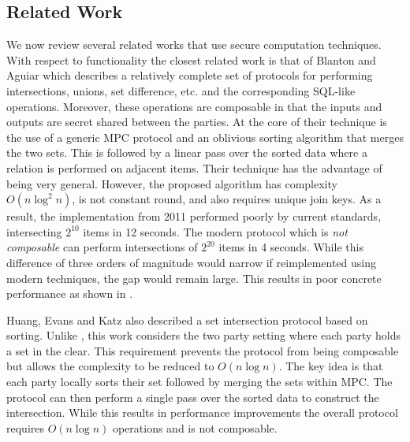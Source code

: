 \subsection{Related Work}
We now review several related works that use secure computation techniques. With respect to functionality the closest related work is that of Blanton and Aguiar\cite{ASIACCS:BlaAgu12} which describes a relatively complete set of protocols for performing intersections, unions, set difference, etc. and the corresponding SQL-like operations. Moreover, these operations are composable in that the inputs and outputs are secret shared between the parties. At the core of their technique is the use of a generic MPC protocol and an oblivious sorting algorithm that merges the two sets. This is followed by a linear pass over the sorted data where a relation is performed on adjacent items. Their technique has the advantage of being very general. However, the proposed algorithm has complexity $O(n \log^2 n)$, is not constant round,  and also requires unique join keys. 
\iffullversion
As a result, the implementation from 2011 performed poorly by current standards, intersecting $2^{10}$ items in 12 seconds. The modern protocol \cite{CCS:KKRT16} which is \emph{not composable} can perform intersections of $2^{20}$ items in 4 seconds. While this difference of three orders of magnitude would narrow if reimplemented using modern techniques, the gap would remain large.
\else
This results in poor concrete performance as shown in .
\fi


\iffullversion
Huang, Evans and Katz\cite{HEK12} also described a set intersection protocol based on sorting. Unlike \cite{ASIACCS:BlaAgu12}, this work considers the two party setting where each party holds a set in the clear.
This requirement prevents the protocol from being composable but allows the complexity to be reduced to $O(n\log n)$. The key idea is that each party locally sorts their set followed by merging the sets within MPC. The protocol can then perform a single pass over the sorted data to construct the intersection. While this results in performance improvements the overall protocol requires  $O(n\log n)$ operations and is not composable.
\fi

